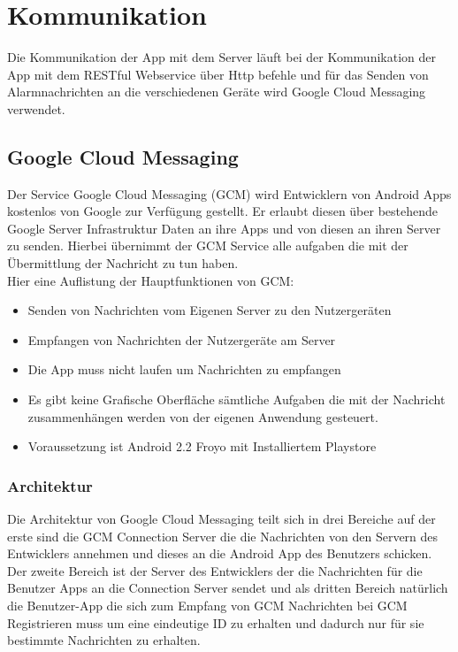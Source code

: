 \section{Kommunikation}
Die Kommunikation der App mit dem Server läuft bei der Kommunikation der App mit dem RESTful Webservice über Http befehle und für das Senden von Alarmnachrichten an die verschiedenen Geräte  wird Google Cloud Messaging verwendet.
\subsection*{Google Cloud Messaging}
Der Service Google Cloud Messaging (GCM) wird Entwicklern von Android Apps kostenlos von Google zur Verfügung gestellt. Er erlaubt diesen über bestehende Google Server Infrastruktur Daten an ihre Apps  und von diesen an ihren Server zu senden. Hierbei übernimmt der GCM Service alle aufgaben die mit der Übermittlung  der Nachricht zu tun haben.\\

Hier eine Auflistung der Hauptfunktionen von GCM:

\begin{itemize}
	\item Senden von Nachrichten vom Eigenen Server zu den Nutzergeräten
	\item Empfangen von Nachrichten der Nutzergeräte am Server
	\item Die App muss nicht laufen um Nachrichten zu empfangen
	\item Es gibt keine Grafische Oberfläche sämtliche Aufgaben die mit der Nachricht zusammenhängen werden von der eigenen Anwendung gesteuert.
	\item Voraussetzung ist Android 2.2 Froyo mit Installiertem Playstore
\end{itemize}

\subsubsection*{Architektur}
Die Architektur von Google Cloud Messaging  teilt sich in drei Bereiche auf der erste sind die GCM Connection Server die die Nachrichten von den Servern des Entwicklers annehmen und dieses an die Android App des Benutzers schicken. Der zweite Bereich ist der Server des Entwicklers der die Nachrichten für die Benutzer Apps an die Connection Server sendet und als dritten Bereich natürlich die Benutzer-App die sich zum Empfang von GCM Nachrichten bei GCM Registrieren muss um eine eindeutige ID zu erhalten und dadurch nur für sie bestimmte  Nachrichten zu erhalten.\\

